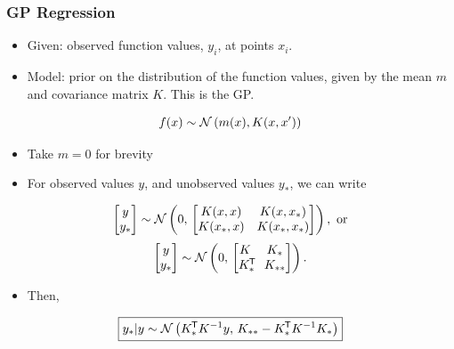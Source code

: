 \begin{frame} \frametitle{GP Regression}
\begin{itemize}
  \item Given: observed function values, $y_i$, at points $x_i$.
  \item Model: prior on the distribution of the function values,
    given by the mean $m$ and covariance matrix $K$.
    This is the GP.
\end{itemize}
\begin{equation}
  f(x) \sim \mathcal{N}\left(m(x),K(x,x')\right)
\end{equation}
  \vspace{-7mm}
\begin{itemize}
  \item Take $m = 0$ for brevity
  \item For observed values $y$, and unobserved values $y_*$, we can
    write
\end{itemize}
\begin{equation}
  \begin{bmatrix} y \\ y_* \end{bmatrix} \sim
  \mathcal{N}\left(0,\,\begin{bmatrix} K(x,x) & K(x,x_*) \\ K(x_*,x) & K(x_*,x_*) \end{bmatrix}\right),
  \ \text{or}
\end{equation}
\begin{equation}
  \begin{bmatrix} y \\ y_* \end{bmatrix} \sim
    \mathcal{N}\left(0,\,\begin{bmatrix} K & K_* \\ K_*^{\mkern-1.5mu\mathsf{T}}\!\! & K_{**} \end{bmatrix}\right).
\end{equation}
  \vspace{-4mm}
\begin{itemize}
  \item Then,
\end{itemize}
\begin{equation}
  \boxed{ y_*|y \sim \mathcal{N}\left(K_*^{\mkern-1.5mu\mathsf{T}} K^{-1}y,\,K_{**}-K_*^{\mkern-1.5mu\mathsf{T}} K^{-1}K_*\right) }
\end{equation}
\end{frame}

